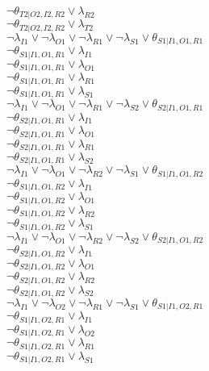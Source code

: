 $\neg\theta_{T2|O2,I2,R2} \vee \lambda_{R2}$\\
$\neg\theta_{T2|O2,I2,R2} \vee \lambda_{T2}$\\
$\neg\lambda_{I1} \vee \neg\lambda_{O1} \vee \neg\lambda_{R1} \vee \neg\lambda_{S1} \vee \theta_{S1|I1,O1,R1}$\\
$\neg\theta_{S1|I1,O1,R1} \vee \lambda_{I1}$\\
$\neg\theta_{S1|I1,O1,R1} \vee \lambda_{O1}$\\
$\neg\theta_{S1|I1,O1,R1} \vee \lambda_{R1}$\\
$\neg\theta_{S1|I1,O1,R1} \vee \lambda_{S1}$\\
$\neg\lambda_{I1} \vee \neg\lambda_{O1} \vee \neg\lambda_{R1} \vee \neg\lambda_{S2} \vee \theta_{S2|I1,O1,R1}$\\
$\neg\theta_{S2|I1,O1,R1} \vee \lambda_{I1}$\\
$\neg\theta_{S2|I1,O1,R1} \vee \lambda_{O1}$\\
$\neg\theta_{S2|I1,O1,R1} \vee \lambda_{R1}$\\
$\neg\theta_{S2|I1,O1,R1} \vee \lambda_{S2}$\\
$\neg\lambda_{I1} \vee \neg\lambda_{O1} \vee \neg\lambda_{R2} \vee \neg\lambda_{S1} \vee \theta_{S1|I1,O1,R2}$\\
$\neg\theta_{S1|I1,O1,R2} \vee \lambda_{I1}$\\
$\neg\theta_{S1|I1,O1,R2} \vee \lambda_{O1}$\\
$\neg\theta_{S1|I1,O1,R2} \vee \lambda_{R2}$\\
$\neg\theta_{S1|I1,O1,R2} \vee \lambda_{S1}$\\
$\neg\lambda_{I1} \vee \neg\lambda_{O1} \vee \neg\lambda_{R2} \vee \neg\lambda_{S2} \vee \theta_{S2|I1,O1,R2}$\\
$\neg\theta_{S2|I1,O1,R2} \vee \lambda_{I1}$\\
$\neg\theta_{S2|I1,O1,R2} \vee \lambda_{O1}$\\
$\neg\theta_{S2|I1,O1,R2} \vee \lambda_{R2}$\\
$\neg\theta_{S2|I1,O1,R2} \vee \lambda_{S2}$\\
$\neg\lambda_{I1} \vee \neg\lambda_{O2} \vee \neg\lambda_{R1} \vee \neg\lambda_{S1} \vee \theta_{S1|I1,O2,R1}$\\
$\neg\theta_{S1|I1,O2,R1} \vee \lambda_{I1}$\\
$\neg\theta_{S1|I1,O2,R1} \vee \lambda_{O2}$\\
$\neg\theta_{S1|I1,O2,R1} \vee \lambda_{R1}$\\
$\neg\theta_{S1|I1,O2,R1} \vee \lambda_{S1}$\\
